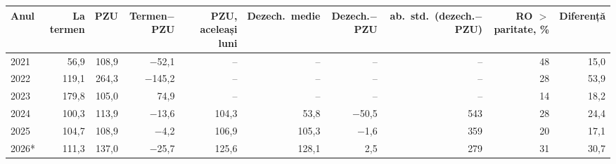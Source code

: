 \begin{tabular}{lrrrrrrrrr}
\toprule
Anul & La termen & PZU & Termen$-$PZU & PZU, aceleași luni & Dezech.\ medie & Dezech.$-$PZU & ab.\ std.\ (dezech.$-$PZU) & RO $>$ paritate, \% & Diferență \\
\midrule
2021 & 56,9 & 108,9 & $-$52,1 & -- & -- & -- & -- & 48 & 15,0 \\
2022 & 119,1 & 264,3 & $-$145,2 & -- & -- & -- & -- & 28 & 53,9 \\
2023 & 179,8 & 105,0 & 74,9 & -- & -- & -- & -- & 14 & 18,2 \\
2024 & 100,3 & 113,9 & $-$13,6 & 104,3 & 53,8 & $-$50,5 & 543 & 28 & 24,4 \\
2025 & 104,7 & 108,9 & $-$4,2 & 106,9 & 105,3 & $-$1,6 & 359 & 20 & 17,1 \\
2026* & 111,3 & 137,0 & $-$25,7 & 125,6 & 128,1 & 2,5 & 279 & 31 & 30,7 \\
\bottomrule
\end{tabular}
